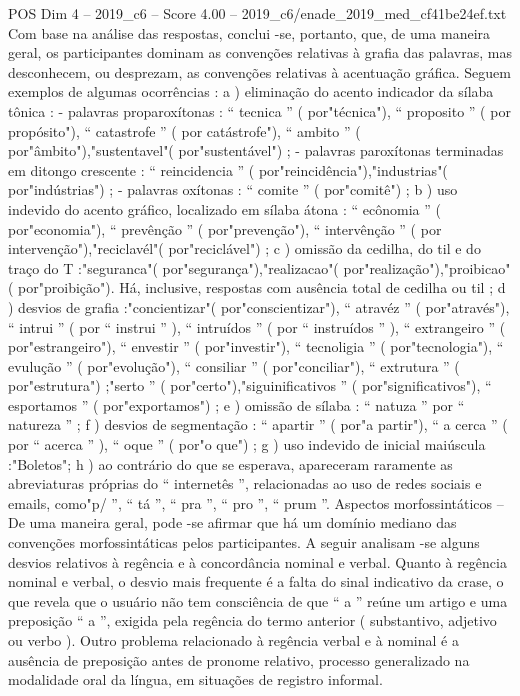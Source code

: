\begin{textsample}{POS Dim 4 – 2019\_c6 – Score 4.00 – 2019\_c6/enade\_2019\_med\_cf41be24ef.txt}
Com base na análise das respostas, conclui -se, portanto, que, de uma maneira geral, os participantes dominam as convenções relativas à grafia das palavras, mas desconhecem, ou desprezam, as convenções relativas à acentuação gráfica.
Seguem exemplos de algumas ocorrências : a ) eliminação do acento indicador da sílaba tônica : - palavras proparoxítonas : “ tecnica ” ( por"técnica"), “ proposito ” ( por propósito"), “ catastrofe ” ( por catástrofe"), “ ambito ” ( por"âmbito"),"sustentavel"( por"sustentável") ; - palavras paroxítonas terminadas em ditongo crescente : “ reincidencia ” ( por"reincidência"),"industrias"( por"indústrias") ; - palavras oxítonas : “ comite ” ( por"comitê") ; b ) uso indevido do acento gráfico, localizado em sílaba átona : “ ecônomia ” ( por"economia"), “ prevênção ” ( por"prevenção"), “ intervênção ” ( por intervenção"),"reciclavél"( por"reciclável") ; c ) omissão da cedilha, do til e do traço do T :"seguranca"( por"segurança"),"realizacao"( por"realização"),"proibicao"( por"proibição").
Há, inclusive, respostas com ausência total de cedilha ou til ; d ) desvios de grafia :"concientizar"( por"conscientizar"), “ atravéz ” ( por"através"), “ intrui ” ( por “ instrui ” ), “ intruídos ” ( por “ instruídos ” ), “ extrangeiro ” ( por"estrangeiro"), “ envestir ” ( por"investir"), “ tecnoligia ” ( por"tecnologia"), “ evulução ” ( por"evolução"), “ consiliar ” ( por"conciliar"), “ extrutura ” ( por"estrutura") ;"serto ” ( por"certo"),"siguinificativos ” ( por"significativos"), “ esportamos ” ( por"exportamos") ; e ) omissão de sílaba : “ natuza ” por “ natureza ” ; f ) desvios de segmentação : “ apartir ” ( por"a partir"), “ a cerca ” ( por “ acerca ” ), “ oque ” ( por"o que") ; g ) uso indevido de inicial maiúscula :"Boletos"; h ) ao contrário do que se esperava, apareceram raramente as abreviaturas próprias do “ internetês ”, relacionadas ao uso de redes sociais e emails, como"p/ ”, “ tá ”, “ pra ”, “ pro ”, “ prum ”.
Aspectos morfossintáticos – De uma maneira geral, pode -se afirmar que há um domínio mediano das convenções morfossintáticas pelos participantes.
A seguir analisam -se alguns desvios relativos à regência e à concordância nominal e verbal.
Quanto à regência nominal e verbal, o desvio mais frequente é a falta do sinal indicativo da crase, o que revela que o usuário não tem consciência de que “ a ” reúne um artigo e uma preposição “ a ”, exigida pela regência do termo anterior ( substantivo, adjetivo ou verbo ).
Outro problema relacionado à regência verbal e à nominal é a ausência de preposição antes de pronome relativo, processo generalizado na modalidade oral da língua, em situações de registro informal.

\end{textsample}
